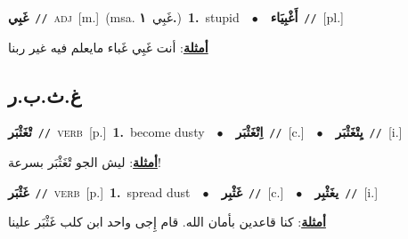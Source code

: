 \documentclass[10pt,a4paper,twoside]{article} %
\begin{document}
\begin{multicols}{2}
{\setlength\topsep{0pt}\textbf{\foreignlanguage{arabic}{غَبِي}}\ {\color{gray}\texttt{//}\color{black}}\ \textsc{adj}\ [m.]\ \color{gray}(msa. \foreignlanguage{arabic}{غَبِي}~\foreignlanguage{arabic}{\textbf{١.}})\color{black}\ \textbf{1.}~stupid\ \ $\bullet$\ \ \setlength\topsep{0pt}\textbf{\foreignlanguage{arabic}{أَغْبِيَاء}}\ {\color{gray}\texttt{//}\color{black}}\ [pl.]\  \begin{flushright}\color{gray}\foreignlanguage{arabic}{\textbf{\underline{\foreignlanguage{arabic}{أمثلة}}}: أنت غَبِي غَباء مايعلم فيه غير ربنا}\end{flushright}\color{black}} \vspace{2mm}

\vspace{-3mm}
\subsection*{\color{blue}\foreignlanguage{arabic}{غ.ث.ب.ر}\color{blue}{}} 

{\setlength\topsep{0pt}\textbf{\foreignlanguage{arabic}{تْغَثْبَر}}\ {\color{gray}\texttt{//}\color{black}}\ \textsc{verb}\ [p.]\ \textbf{1.}~become dusty\ \ $\bullet$\ \ \setlength\topsep{0pt}\textbf{\foreignlanguage{arabic}{اِتْغَثْبَر}}\ {\color{gray}\texttt{//}\color{black}}\ [c.]\ \ $\bullet$\ \ \setlength\topsep{0pt}\textbf{\foreignlanguage{arabic}{يِتْغَثْبَر}}\ {\color{gray}\texttt{//}\color{black}}\ [i.]\  \begin{flushright}\color{gray}\foreignlanguage{arabic}{\textbf{\underline{\foreignlanguage{arabic}{أمثلة}}}: ليش الجو تْغَثْبَر بسرعة!}\end{flushright}\color{black}} \vspace{2mm}

{\setlength\topsep{0pt}\textbf{\foreignlanguage{arabic}{غَثْبَر}}\ {\color{gray}\texttt{//}\color{black}}\ \textsc{verb}\ [p.]\ \textbf{1.}~spread dust\ \ $\bullet$\ \ \setlength\topsep{0pt}\textbf{\foreignlanguage{arabic}{غَثْبِر}}\ {\color{gray}\texttt{//}\color{black}}\ [c.]\ \ $\bullet$\ \ \setlength\topsep{0pt}\textbf{\foreignlanguage{arabic}{يغَثْبِر}}\ {\color{gray}\texttt{//}\color{black}}\ [i.]\  \begin{flushright}\color{gray}\foreignlanguage{arabic}{\textbf{\underline{\foreignlanguage{arabic}{أمثلة}}}: كنا قاعدين بأمان الله. قام إِجى واحد ابن كلب غَثْبَر علينا}\end{flushright}\color{black}} \vspace{2mm}


\end{multicols}
\end{document}
